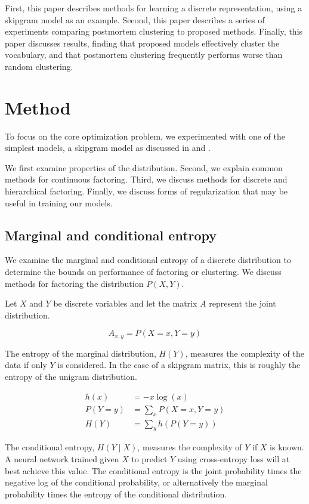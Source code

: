 \documentclass[11pt,letterpaper]{article}
\begin{document}
First, this paper describes methods for learning a discrete representation, using a skipgram model as an example. Second, this paper describes a series of experiments comparing postmortem clustering to proposed methods. Finally, this paper discusses results, finding that proposed models effectively cluster the vocabulary, and that postmortem clustering frequently performs worse than random clustering.

\section{Method}

To focus on the core optimization problem, we experimented with one of the simplest models, a skipgram model as discussed in \cite{Mikolov1301} and \cite{MikolovSCCD13}.

We first examine properties of the distribution. Second, we explain common methods for continuous factoring. Third, we discuss methods for discrete and hierarchical factoring. Finally, we discuss forms of regularization that may be useful in training our models.

\subsection{Marginal and conditional entropy}

We examine the marginal and conditional entropy of a discrete distribution to determine the bounds on performance of factoring or clustering. We discuss methods for factoring the distribution $P(X,Y)$.

Let $X$ and $Y$ be discrete variables and let the matrix $A$ represent the joint distribution.

$$A_{x,y}=P(X=x, Y=y)$$

The entropy of the marginal distribution, $H(Y)$, measures the complexity of the data if only $Y$ is considered. In the case of a skipgram matrix, this is roughly the entropy of the unigram distribution.

\begin{align*}
h(x) &= -x \log(x) \\
P(Y=y) &= \sum_x P(X=x, Y=y) \\
H(Y) &=  \sum_y h(P(Y=y))
\end{align*}

The conditional entropy, $H(Y \mid X)$, measures the complexity of $Y$ if $X$ is known. A neural network trained given $X$ to predict $Y$ using cross-entropy loss will at best achieve this value. The conditional entropy is the joint probability times the negative log of the conditional probability, or alternatively the marginal probability times the entropy of the conditional distribution.
\end{document}
